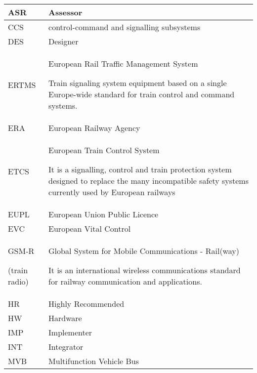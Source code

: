\documentclass{template/openetcs_article}
\begin{document}
\begin{supertabular}{|m{3cm}m{11cm}|}
\hline
ASR &
Assessor\\\hline
CCS &
control-command and signalling subsystems  \\\hline
DES &
Designer\\\hline
ERTMS &
European Rail Traffic Management System

Train signaling system equipment based on a single Europe-wide standard for train control and command systems.\\\hline
ERA &
European Railway Agency\\\hline
ETCS &
European Train Control System

It is a signalling, control and train protection system designed to replace the many incompatible safety systems currently used by European railways\\\hline
EUPL &
European Union Public Licence\\\hline
EVC &
European Vital Control\\\hline
GSM-R

(train radio) &
Global System for Mobile Communications - Rail(way)

It is an international wireless communications standard for railway communication and applications.\\\hline
HR &
Highly Recommended\\\hline
HW &
Hardware\\\hline
IMP &
Implementer\\\hline
INT &
Integrator\\\hline
MVB &
Multifunction Vehicle Bus


\end{supertabular}
\end{document}
